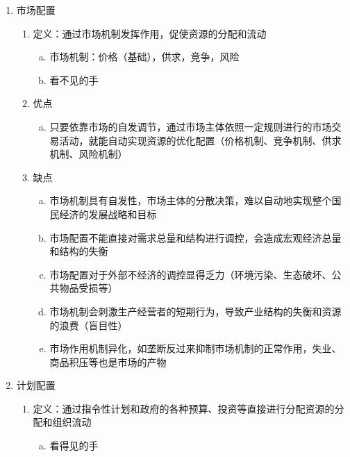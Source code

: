 \documentclass[12pt]{book}
\begin{document}
\begin{enumerate}[1.]
    \item 市场配置
          \begin{enumerate}[(1)]
              \item 定义：通过市场机制发挥作用，促使资源的分配和流动
                    \begin{enumerate}[a.]
                        \item 市场机制：价格（基础），供求，竞争，风险
                        \item 看不见的手
                    \end{enumerate}
              \item 优点
                    \begin{enumerate}[a.]
                        \item  只要依靠市场的自发调节，通过市场主体依照一定规则进行的市场交易活动，就能自动实现资源的优化配置（价格机制、竞争机制、供求机制、风险机制）
                    \end{enumerate}
              \item 缺点
                    \begin{enumerate}[a.]
                        \item 市场机制具有自发性，市场主体的分散决策，难以自动地实现整个国民经济的发展战略和目标
                        \item 市场配置不能直接对需求总量和结构进行调控，会造成宏观经济总量和结构的失衡
                        \item 市场配置对于外部不经济的调控显得乏力（环境污染、生态破坏、公共物品受损等）
                        \item 市场机制会刺激生产经营者的短期行为，导致产业结构的失衡和资源的浪费（盲目性）
                        \item 市场作用机制异化，如垄断反过来抑制市场机制的正常作用，失业、商品积压等也是市场的产物
                    \end{enumerate}
          \end{enumerate}
    \item 计划配置
          \begin{enumerate}[(1)]
              \item 定义：通过指令性计划和政府的各种预算、投资等直接进行分配资源的分配和组织流动
                    \begin{enumerate}[a.]
                        \item 看得见的手
                    \end{enumerate}

\end{enumerate}
\end{enumerate}
\end{document}
